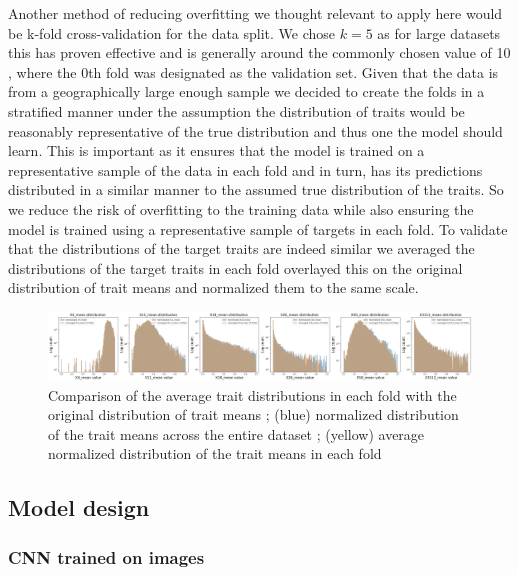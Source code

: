 \documentclass[12pt,a4paper,oneside]{article}
\begin{document}
\smallskip
Another method of reducing overfitting we thought relevant to apply here would be k-fold cross-validation for the data split. We chose $k=5$ as for large datasets this has proven effective \cite{Marcot2021} and is generally around the commonly chosen value of 10 \cite{kequal10isgood}, where the 0th fold was designated as the validation set. Given that the data is from a geographically large enough sample we decided to create the folds in a stratified manner under the assumption the distribution of traits would be reasonably representative of the true distribution and thus one the model should learn. This is important as it ensures that the model is trained on a representative sample of the data in each fold and in turn, has its predictions distributed in a similar manner to the assumed true distribution of the traits. So we reduce the risk of overfitting to the training data while also ensuring the model is trained using a representative sample of targets in each fold. To validate that the distributions of the target traits are indeed similar we averaged the distributions of the target traits in each fold overlayed this on the original distribution of trait means and normalized them to the same scale.  

\begin{figure}[!h]
    \centering
    \includegraphics[width=1\textwidth]{assets/distribution_match_folds.png}
    \caption{Comparison of the average trait distributions in each fold with the original distribution of trait means ; (blue) normalized distribution of the trait means across the entire dataset ; (yellow) average normalized distribution of the trait means in each fold}
\end{figure}

\subsection{Model design}

\subsubsection{CNN trained on images}
\end{document}
